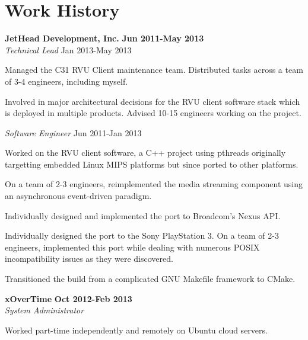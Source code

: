 \section{Work History}
\begin{lonelist}

\item[] \textbf{JetHead Development, Inc.} \hfill \textbf{Jun 2011-May 2013}\\
  \textit{Technical Lead} \hfill Jan 2013-May 2013
  \begin{innerlist}
  \item Managed the C31 RVU Client maintenance team. Distributed tasks across a
      team of 3-4 engineers, including myself.

  \item Involved in major architectural decisions for the RVU client software
      stack which is deployed in multiple products. Advised 10-15 engineers
      working on the project.
  \end{innerlist}

\item[]%
  \textit{Software Engineer} \hfill Jun 2011-Jan 2013
  \begin{innerlist}
  \item Worked on the RVU client software, a C++ project using pthreads
      originally targetting embedded Linux MIPS platforms but since ported to
      other platforms.

  \item On a team of 2-3 engineers, reimplemented the media streaming component
      using an asynchronous event-driven paradigm.

  \item Individually designed and implemented the port to Broadcom's Nexus API.

  \item Individually designed the port to the Sony PlayStation 3. On a team
      of 2-3 engineers, implemented this port while dealing with numerous
      POSIX incompatibility issues as they were discovered.

  \item Transitioned the build from a complicated GNU Makefile framework to
      CMake.
  \end{innerlist}

\item[] \textbf{xOverTime} \hfill \textbf{Oct 2012-Feb 2013}\\
  \textit{System Administrator}
  \begin{innerlist}
  \item Worked part-time independently and remotely on Ubuntu cloud servers.


\end{innerlist}
\end{lonelist}
